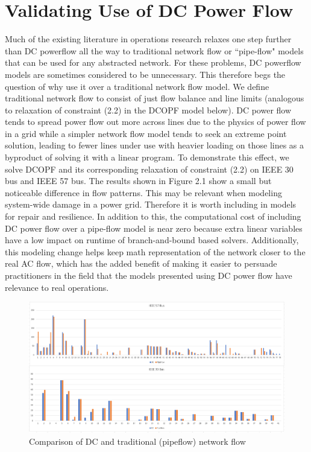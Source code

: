 \section{Validating Use of DC Power Flow}

Much of the existing literature in operations research relaxes one step further than DC powerflow all the way to traditional network flow or ``pipe-flow" models that can be used for any abstracted network. For these problems, DC powerflow models are sometimes considered to be unnecessary. This therefore begs the question of why use it over a traditional network flow model. We define traditional network flow to consist of just flow balance and line limits (analogous to relaxation of constraint (2.2) in the DCOPF model below). DC power flow tends to spread power flow out more across lines due to the physics of power flow in a grid while a simpler network flow model tends to seek an extreme point solution, leading to fewer lines under use with heavier loading on those lines as a byproduct of solving it with a linear program. To demonstrate this effect, we solve DCOPF and its corresponding relaxation of constraint (2.2) on IEEE 30 bus and IEEE 57 bus. The results shown in Figure 2.1 show a small but noticeable difference in flow patterns. This may be relevant when modeling system-wide damage in a power grid. Therefore it is worth including in models for repair and resilience. In addition to this, the computational cost of including DC power flow over a pipe-flow model is near zero because extra linear variables have a low impact on runtime of branch-and-bound based solvers. Additionally, this modeling change helps keep math representation of the network closer to the real AC flow, which has the added benefit of making it easier to persuade practitioners in the field that the models presented using DC power flow have relevance to real operations.

\begin{figure}
	\centering
	\includegraphics[width=\linewidth]{DCvsPipeflow.PNG}
	\caption{Comparison of DC and traditional (pipeflow) network flow}
\end{figure}

